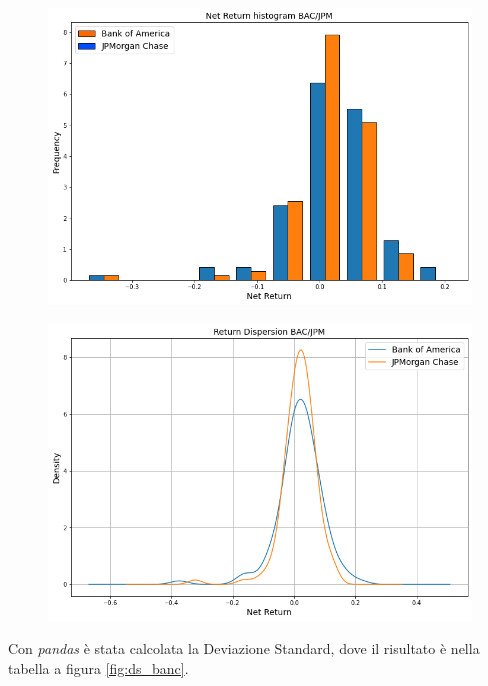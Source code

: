 \documentclass{article}
\begin{document}
\begin{figure}[h]
  \centering
  \begin{minipage}{.5\textwidth}
    \centering
    \includegraphics[width=1\linewidth]{net_ret_banc_hist.png}
    \label{fig:isto_rendimenti_banc}
  \end{minipage}%
  \begin{minipage}{.5\textwidth}
    \centering
    \includegraphics[width=1\linewidth]{dispersione_banc.png}
    \label{fig:dispersione_banc}
  \end{minipage}
\end{figure}

Con \emph{pandas} è stata calcolata la Deviazione Standard, dove il risultato è nella tabella a figura \ref{fig:ds_banc}.
\end{document}
